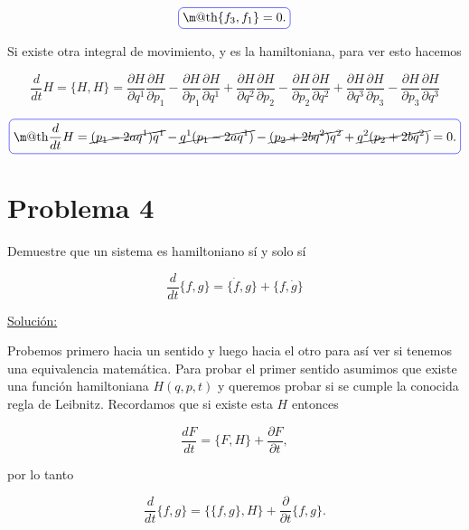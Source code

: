 \documentclass[a4paper,10pt]{article}
\makeatletter
\numberwithin{equation}{section}
\newcommand*{\boxcolor}{blue}
\renewcommand{\boxed}[1]{\textcolor{\boxcolor}{%
\tikz[baseline={([yshift=-1ex]current bounding box.center)}] \node [rectangle, minimum width=1ex,rounded corners,draw] {\normalcolor\m@th$\displaystyle#1$};}}
\makeatother
\begin{document}
\begin{equation}
 \boxed{ \{f_3,f_1\} = 0 .}
\end{equation}


Si existe otra integral de movimiento, y es la hamiltoniana, para ver esto hacemos 

\begin{equation}
 \frac{d}{dt} H = \{H,H\} = \frac{\partial H}{\partial q^1}\frac{\partial H}{\partial p_1} - 
 \frac{\partial H}{\partial p_1}\frac{\partial H}{\partial q^1} +  \frac{\partial H}{\partial q^2}\frac{\partial H}{\partial p_2} - 
 \frac{\partial H}{\partial p_2}\frac{\partial H}{\partial q^2} +  \frac{\partial H}{\partial q^3}\frac{\partial H}{\partial p_3} - 
 \frac{\partial H}{\partial p_3}\frac{\partial H}{\partial q^3}
\end{equation}

\begin{equation}
  \boxed{\frac{d}{dt} H = \cancel{(p_1 - 2aq^1)q^1} - \cancel{q^1(p_1 - 2aq^1)} - \cancel{(p_2 + 2bq^2)q^2} + 
  \cancel{q^2(p_2 + 2bq^2)} = 0.}
\end{equation}




\section{Problema 4}

Demuestre que un sistema es hamiltoniano sí y solo sí

$$
\frac{d}{dt}\{f,g\} = \{\dot{f},g\} + \{f,\dot{g}\}
$$

\vspace{.3cm}

\underline{Solución:} \vspace{.3cm}

Probemos primero hacia un sentido y luego hacia el otro para así ver si tenemos una equivalencia 
matemática. Para probar el primer sentido asumimos que existe una función hamiltoniana 
$H(q,p,t)$ y queremos probar si se cumple la conocida regla de Leibnitz. Recordamos 
que si existe esta $H$ entonces 

\begin{equation}
 \frac{dF}{dt} = \{F,H\} + \frac{\partial F}{\partial t},
 \label{eq:41}
\end{equation}

por lo tanto

\begin{equation}
 \frac{d}{dt}\{f,g\} = \{\{f,g\},H\} + \frac{\partial}{\partial t}\{f,g\}.
 \label{eq:42}
\end{equation}
\end{document}

